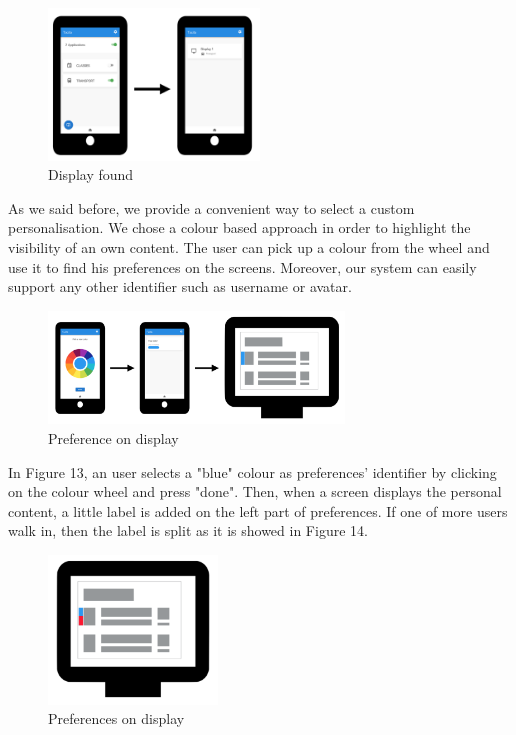 \documentclass[]{usiinfbachelorproject}
\begin{document}
\begin{figure}[H]
\centering
\includegraphics[width=0.5\textwidth]{./images/smartphone_displays}
\caption{Display found}
\end{figure}
As we said before, we  provide a convenient way to select a custom personalisation. We chose a colour based approach in order to highlight the visibility of an own content. The user can pick up a colour from the wheel and use it to find his preferences on the screens. Moreover, our system can easily support any other identifier such as username or avatar.
\begin{figure}[H]
  \centering
  \includegraphics[width=0.7\textwidth]{./images/smartphone_color_preference}
  \caption{Preference on display}
\end{figure}
In Figure 13, an user selects a "blue" colour as preferences' identifier by clicking on the colour wheel and press "done". Then, when a screen displays the personal content, a little label is added on the left part of preferences. If one of more users walk in, then the label is split as it is showed in Figure 14.
\begin{figure}[H]
  \centering
\includegraphics[width=0.4\textwidth]{./images/preference_colour/preference_splited}
  \caption{Preferences on display}

\end{figure}
\newpage
\end{document}
